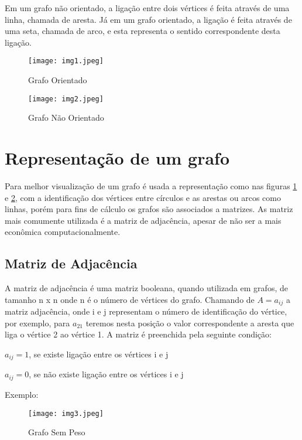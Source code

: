 Em um grafo não orientado, a ligação entre dois vértices é feita através de uma linha, chamada de aresta. Já em um grafo orientado, a ligação é feita através de uma seta, chamada de arco, e esta representa o sentido correspondente desta ligação.

\begin{figure}[h!]
	\centering
	\texttt{[image: img1.jpeg]}
	\caption{Grafo Orientado}
	\label{img1}
\end{figure}
\begin{figure}[h!]
	\centering
	\texttt{[image: img2.jpeg]}
	\caption{Grafo Não Orientado}
	\label{img2}
\end{figure}

\section{Representação de um grafo}

Para melhor visualização de um grafo é usada a representação como nas figuras \ref{img1} e \ref{img2}, com a identificação dos vértices entre círculos e as arestas ou arcos como linhas, porém para fins de cálculo os grafos são associados a matrizes. As matriz mais comumente utilizada é a matriz de adjacência, apesar de não ser a mais econômica computacionalmente.

\subsection{Matriz de Adjacência}

A matriz de adjacência é uma matriz booleana, quando utilizada em grafos, de tamanho n x n onde n é o número de vértices do grafo. Chamando de $A=a_{ij}$ a matriz adjacência, onde i  e j representam o número de identificação do vértice, por exemplo, para $a_{21}$ teremos nesta posição o valor correspondente a aresta que liga o vértice 2 ao vértice 1. A matriz é preenchida pela seguinte condição:

$a_{ij}=1$, se existe ligação entre os vértices i e j

$a_{ij}=0$, se não existe ligação entre os vértices i e j

Exemplo:

\begin{figure}[h!]
	\centering
	\texttt{[image: img3.jpeg]}
	\caption{Grafo Sem Peso}
	\label{img3}
\end{figure}

